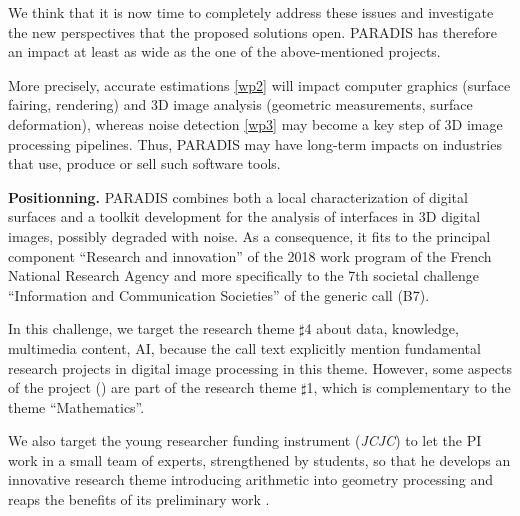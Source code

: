 We think that it is now time to completely address these issues and investigate
the new perspectives that the proposed solutions open. 
PARADIS has therefore an impact at least as wide as the one of the above-mentioned
projects. 

More precisely, accurate estimations \ref{wp2} will impact computer graphics
(surface fairing, rendering) and 3D image analysis (geometric measurements, surface deformation), 
whereas noise detection \ref{wp3} may become a key step of 3D image processing pipelines.  
Thus, PARADIS may have long-term impacts on industries that use, produce or sell such software tools. 


\noindent\textbf{Positionning.}
PARADIS combines both a local characterization of digital surfaces 
and a toolkit development for the analysis of interfaces in 3D digital images, 
possibly degraded with noise. 
As a consequence, it fits to the principal component ``Research and innovation''
of the 2018 work program of the French National Research Agency 
and more specifically to the 7th societal challenge ``Information and Communication Societies''
of the generic call (B7).    



In this challenge, we target the research theme $\sharp$4 about data, knowledge, multimedia content, AI, 
because the call text explicitly mention fundamental research projects in digital image processing in this theme. However, some aspects of the project (\wpPattern) are part of the research theme $\sharp$1, 
which is complementary to the theme ``Mathematics''.    



We also target the young researcher funding instrument (\emph{JCJC}) 
to let the PI work in a small team of experts, strengthened by students, so that
he develops an innovative research theme introducing arithmetic into geometry processing and
reaps the benefits of its preliminary work \cite{LPRJMIV2017}. 



